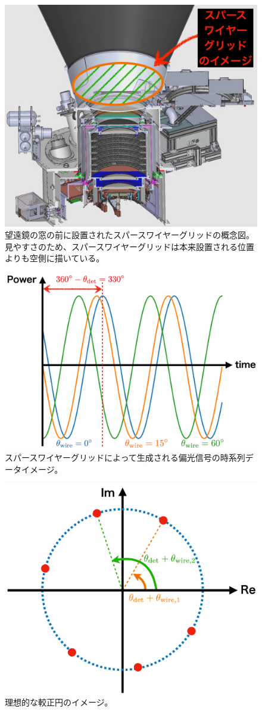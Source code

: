 \documentclass[../../main.tex]{subfiles}
\begin{document}
\begin{figure}[H]
    \centering
    \includegraphics[width=0.8\columnwidth]{wiregrid/wiregrid_telescope_image.pdf}
    \caption{望遠鏡の窓の前に設置されたスパースワイヤーグリッドの概念図。
    見やすさのため、スパースワイヤーグリッドは本来設置される位置よりも空側に描いている。
    }
    \label{fig:wiregrid_telescope}
\end{figure}
\begin{figure}[H]
    \centering
    \includegraphics[width=0.8\columnwidth]{wiregrid/wiregrid_tod.pdf}
    \caption[スパースワイヤーグリッドによって生成される偏光信号の時系列データイメージ]{スパースワイヤーグリッドによって生成される偏光信号の時系列データイメージ。}
    \label{fig:wiregrid_mod}
\end{figure}
\begin{figure}[H]
    \centering
    \includegraphics[width=0.6\columnwidth]{wiregrid/wiregrid_calibration_circle.pdf}
    \caption{理想的な較正円のイメージ。}
    \label{fig:calibration_circle}
\end{figure}
\end{document}
